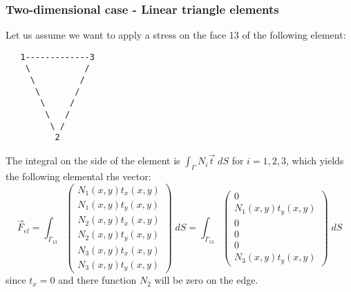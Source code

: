 

\subsubsection{Two-dimensional case - Linear triangle elements}

Let us assume we want to apply a stress on the face 13 of the following element:
\begin{verbatim}
   1-------------3
    \           /
     \         /
      \       /
       \     /
        \   /
         \ /
          2
\end{verbatim}

The integral on the side of the element is $\int_\Gamma N_i {\vec t} \; dS$
for $i=1,2,3$, which yields the following elemental rhs vector:
\[
\vec{F}_{el}=
\int_{\Gamma_{13}} 
\left(
\begin{array}{c}
N_1(x,y) t_x(x,y)\\
N_1(x,y) t_y(x,y)\\
N_2(x,y) t_x(x,y)\\
N_2(x,y) t_y(x,y)\\
N_3(x,y) t_x(x,y)\\
N_3(x,y) t_y(x,y)
\end{array}
\right)
\; dS
=
\int_{\Gamma_{13}} 
\left(
\begin{array}{c}
0\\
N_1(x,y) t_y(x,y)\\
0\\
0\\
0\\
N_3(x,y) t_y(x,y)
\end{array}
\right)
\; dS
\]
since $t_x=0$ and there function $N_2$ will be zero on the edge.

